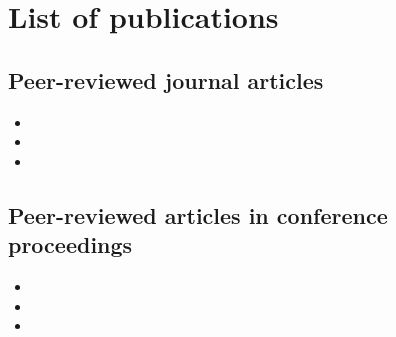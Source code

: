 \chapter*{List of publications}

\section*{Peer-reviewed journal articles}

\begin{itemize}[leftmargin=4mm]
\item   
\item   
\item   
\end{itemize}


\section*{Peer-reviewed articles in conference proceedings}

\begin{itemize}[leftmargin=4mm]
\item   
\item   
\item   
\end{itemize}

